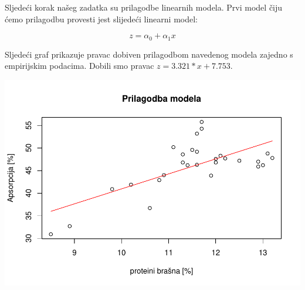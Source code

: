\documentclass[]{article}
\newenvironment{Shaded}{\begin{snugshade}}{\end{snugshade}}
\newcommand{\KeywordTok}[1]{\textcolor[rgb]{0.13,0.29,0.53}{\textbf{{#1}}}}
\newcommand{\DataTypeTok}[1]{\textcolor[rgb]{0.13,0.29,0.53}{{#1}}}
\newcommand{\StringTok}[1]{\textcolor[rgb]{0.31,0.60,0.02}{{#1}}}
\newcommand{\NormalTok}[1]{{#1}}
\begin{document}
Sljedeći korak našeg zadatka su prilagodbe linearnih modela. Prvi model
čiju ćemo prilagodbu provesti jest slijedeći linearni model:

\begin{equation}
z = \alpha_0 + \alpha_1 x
\end{equation}

\begin{Shaded}
\end{Shaded}

Sljedeći graf prikazuje pravac dobiven prilagodbom navedenog modela
zajedno s empirijskim podacima. Dobili smo pravac
\(z = 3.321*x + 7.753\).

\begin{Shaded}
\end{Shaded}

\includegraphics{Izvjestaj_files/figure-latex/unnamed-chunk-29-1.pdf}
\end{document}
